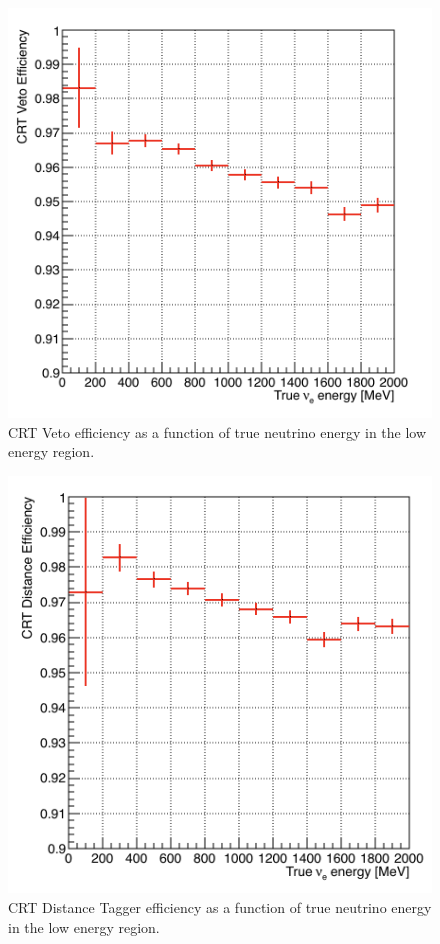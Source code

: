 \begin{figure}[h!]
\centering
\includegraphics[scale=0.4]{images/CRTVetoEfficiency}
\caption{CRT Veto efficiency as a function of true neutrino energy in the low energy region.}
\label{fig:VetoE}
\end{figure}

\begin{figure}[h!]
\centering
\includegraphics[scale=0.4]{images/CRTDistanceEfficiency}
\caption{CRT Distance Tagger efficiency as a function of true neutrino energy in the low energy region.}
\label{fig:DistanceE}
\end{figure}

